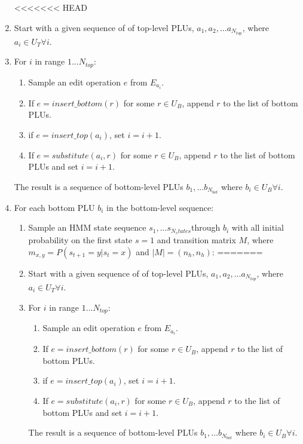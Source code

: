 \documentclass[11pt]{article}
\begin{document}
\begin{enumerate}

<<<<<<< HEAD
\item Start with a given sequence of of top-level PLUs,
  $a_1, a_2, ... a_{N_{top}}$, where $a_i \in U_T \forall i$.

\item For $i$ in range $1...N_{top}$:
\begin{enumerate}
\item Sample an edit operation $e$ from $E_{a_i}$.
\item If $e = insert\_bottom(r)$ for some $r \in U_B$, append $r$ to
  the list of bottom PLUs.
\item if $e = insert\_top(a_i)$, set $i=i+1$.
\item If $e = substitute(a_i,r)$ for some $r \in U_B$, append $r$ to
  the list of bottom PLUs and set $i=i+1$.
\end{enumerate}

The result is a sequence of bottom-level PLUs $b_1,...b_{N_{bot}}$
where $b_i \in U_B \forall i$.

\item For each bottom PLU $b_i$ in the bottom-level sequence:
\begin{enumerate}
\item Sample an HMM state sequence $s_1,...s_{N_states}$through $b_i$
  with all initial probability on the first state $s=1$ and transition
  matrix $M$, where $m_{x,y}=P(s_{t+1}=y|s_t=x)$ and $|M|=(n_h,n_h)$:
=======
\item Start with a given sequence of of top-level PLUs, $a_1, a_2, ... a_{N_{top}}$, where $a_i \in U_T \forall i$.

\item For $i$ in range $1...N_{top}$:
\begin{enumerate}
	\item Sample an edit operation $e$ from $E_{a_i}$.
	\item If $e = insert\_bottom(r)$ for some $r \in U_B$, append $r$ to the list of bottom PLUs.
	\item if $e = insert\_top(a_i)$, set $i=i+1$.
	\item If $e = substitute(a_i,r)$ for some $r \in U_B$, append $r$ to the list of bottom PLUs and set $i=i+1$.
\end{enumerate}

The result is a sequence of bottom-level PLUs $b_1,...b_{N_{bot}}$ where $b_i \in U_B \forall i$.


\end{enumerate}
\end{enumerate}
\end{document}
